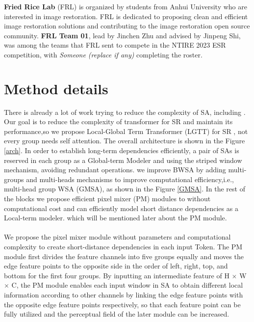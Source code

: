 \documentclass[10pt,twocolumn,letterpaper]{article}
\begin{document}
\textbf{Fried Rice Lab} (FRL) is organized by students from Anhui University who are interested in image restoration. FRL is dedicated to proposing clean and efficient image restoration solutions and contributing to the image restoration open source community. \textbf{FRL Team 01}, lead by Jinchen Zhu and advised by Jinpeng Shi, was among the teams that FRL sent to compete in the NTIRE 2023 ESR competition, with \textit{Someone (replace if any)} completing the roster.

\section{Method details}
There is already a lot of work trying to reduce the complexity of SA, including \cite{performer,sparsetrans,reformer}. Our goal is to reduce the complexity of transformer for SR and maintain its performance,so we propose Local-Global Term Transformer (LGTT) for SR , not every group needs self attention. The overall architecture is shown in the Figure \ref{arch}. In order to establish long-term dependencies efficiently, a pair of SAs is reserved in each group as a Global-term Modeler and using the striped window mechanism\cite{ESWT}, avoiding redundant operations. we improve BWSA by adding multi-groups and multi-heads mechanisms to improve computational efficiency,i.e., multi-head group WSA (GMSA), as shown in the Figure \ref{GMSA}. In the rest of the blocks we propose efficient pixel mixer (PM) modules to without computational cost and can efficiently model short distance dependencies as a Local-term modeler. which will be mentioned later about the PM module.
\\ \hspace*{\fill} \\
\label{PM}
We propose the pixel mixer module without parameters and computational complexity to create short-distance dependencies in each input Token. The PM module first divides the feature channels into five groups equally and moves the edge feature points to the opposite side in the order of left, right, top, and bottom for the first four groups. By inputting an intermediate feature of H $\times$ W $\times$ C, the PM module enables each input window in SA to obtain different local information according to other channels by linking the edge feature points with the opposite edge feature points respectively, so that each feature point can be fully utilized and the perceptual field of the later module can be increased.
\end{document}
